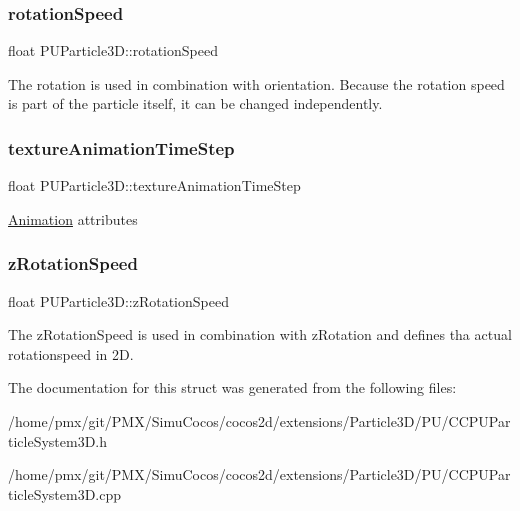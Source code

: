 \subsubsection{\texorpdfstring{rotation\+Speed}{rotationSpeed}}
{\footnotesize\ttfamily float P\+U\+Particle3\+D\+::rotation\+Speed}

The rotation is used in combination with orientation. Because the rotation speed is part of the particle itself, it can be changed independently. \mbox{\label{structPUParticle3D_a63797f819d67dd9e470e74f9de595e3e}} 
\subsubsection{\texorpdfstring{texture\+Animation\+Time\+Step}{textureAnimationTimeStep}}
{\footnotesize\ttfamily float P\+U\+Particle3\+D\+::texture\+Animation\+Time\+Step}

\hyperlink{classAnimation}{Animation} attributes \mbox{\label{structPUParticle3D_af9b4dbc93f32626b6065d03995b09e42}} 
\subsubsection{\texorpdfstring{z\+Rotation\+Speed}{zRotationSpeed}}
{\footnotesize\ttfamily float P\+U\+Particle3\+D\+::z\+Rotation\+Speed}

The z\+Rotation\+Speed is used in combination with z\+Rotation and defines tha actual rotationspeed in 2D. 

The documentation for this struct was generated from the following files\+:\begin{DoxyCompactItemize}
\item 
/home/pmx/git/\+P\+M\+X/\+Simu\+Cocos/cocos2d/extensions/\+Particle3\+D/\+P\+U/C\+C\+P\+U\+Particle\+System3\+D.\+h\item 
/home/pmx/git/\+P\+M\+X/\+Simu\+Cocos/cocos2d/extensions/\+Particle3\+D/\+P\+U/C\+C\+P\+U\+Particle\+System3\+D.\+cpp\end{DoxyCompactItemize}
